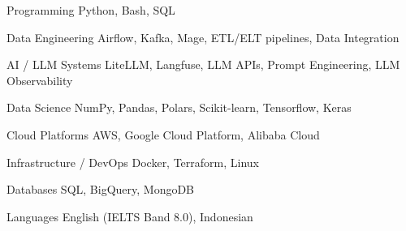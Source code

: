 

\begin{cvskills}

  \cvskill
    {Programming} %
    {Python, Bash, SQL} %

  \cvskill
    {Data Engineering} %
    {Airflow, Kafka, Mage, ETL/ELT pipelines, Data Integration} %

  \cvskill
    {AI / LLM Systems} %
    {LiteLLM, Langfuse, LLM APIs, Prompt Engineering, LLM Observability} %

  \cvskill
    {Data Science} %
    {NumPy, Pandas, Polars, Scikit-learn, Tensorflow, Keras} %

  \cvskill
    {Cloud Platforms} %
    {AWS, Google Cloud Platform, Alibaba Cloud} %

  \cvskill
    {Infrastructure / DevOps}
    {Docker, Terraform, Linux}

  \cvskill
    {Databases} %
    {SQL, BigQuery, MongoDB} %

  \cvskill
    {Languages} %
    {English (IELTS Band 8.0), Indonesian} %

\end{cvskills}
